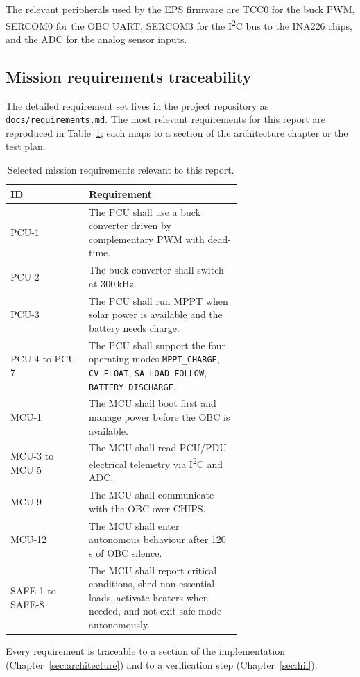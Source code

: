 The relevant peripherals used by the EPS firmware are TCC0 for the
buck PWM, SERCOM0 for the OBC UART, SERCOM3 for the I\textsuperscript{2}C bus
to the INA226 chips, and the ADC for the analog sensor inputs.

\subsection{Mission requirements traceability}

The detailed requirement set lives in the project repository as
\texttt{docs/requirements.md}. The most relevant requirements for
this report are reproduced in Table~\ref{tab:requirements}; each
maps to a section of the architecture chapter or the test plan.

\begin{table}[ht]
\centering
\caption{Selected mission requirements relevant to this report.}
\label{tab:requirements}
\small
\begin{tabular}{@{}lp{0.66\linewidth}@{}}
\toprule
\textbf{ID} & \textbf{Requirement} \\
\midrule
PCU-1 & The PCU shall use a buck converter driven by complementary
PWM with dead-time. \\
PCU-2 & The buck converter shall switch at 300\,kHz. \\
PCU-3 & The PCU shall run MPPT when solar power is available and
the battery needs charge. \\
PCU-4 to PCU-7 & The PCU shall support the four operating modes
\texttt{MPPT\_CHARGE}, \texttt{CV\_FLOAT},
\texttt{SA\_LOAD\_FOLLOW}, \texttt{BATTERY\_DISCHARGE}. \\
MCU-1 & The MCU shall boot first and manage power before the OBC is
available. \\
MCU-3 to MCU-5 & The MCU shall read PCU/PDU electrical telemetry
via I\textsuperscript{2}C and ADC. \\
MCU-9 & The MCU shall communicate with the OBC over CHIPS. \\
MCU-12 & The MCU shall enter autonomous behaviour after 120\,s of
OBC silence. \\
SAFE-1 to SAFE-8 & The MCU shall report critical conditions, shed
non-essential loads, activate heaters when needed, and not exit
safe mode autonomously. \\
\bottomrule
\end{tabular}
\end{table}

Every requirement is traceable to a section of the implementation
(Chapter~\ref{sec:architecture}) and to a verification step
(Chapter~\ref{sec:hil}).
